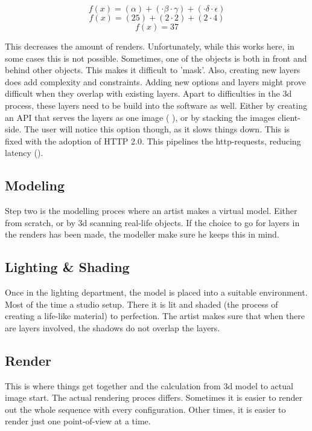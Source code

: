 \[ f(x) = (\alpha) + (\cdot \beta \cdot \gamma) + (\cdot \delta \cdot \epsilon)\]
\[ f(x) = (25) + (2 \cdot 2) + (2 \cdot 4)\]
\[ f(x) = 37\]

This decreases the amount of renders. Unfortunately, while this works here, in some cases this is not possible. Sometimes, one of the objects is both in front and behind other objects. This makes it difficult to 'mask'. Also, creating new layers does add complexity and constraints. Adding new options and layers might prove difficult when they overlap with existing layers.
\newline
Apart to difficulties in the 3d process, these layers need to be build into the software as well. Either by creating an API that serves the layers as one image (\cite{Bugaboo} ), or by stacking the images client-side. The user will notice this option though, as it slows things down. This is fixed with the adoption of HTTP 2.0. This pipelines the http-requests, reducing latency (\cite{latency}).

\subsection{Modeling}
Step two is the modelling proces where an artist makes a virtual model. Either from scratch, or by 3d scanning real-life objects. If the choice to go for layers in the renders has been made, the modeller make sure he keeps this in mind.

\subsection{Lighting \& Shading}
Once in the lighting department, the model is placed into a suitable environment. Most of the time a studio setup. There it is lit and shaded (the process of creating a life-like material) to perfection. The artist makes sure that when there are layers involved, the shadows do not overlap the layers.
\subsection{Render}
This is where things get together and the calculation from 3d model to actual image start. The actual rendering proces differs. Sometimes it is easier to render out the whole sequence with every configuration. Other times, it is easier to render just one point-of-view at a time.


